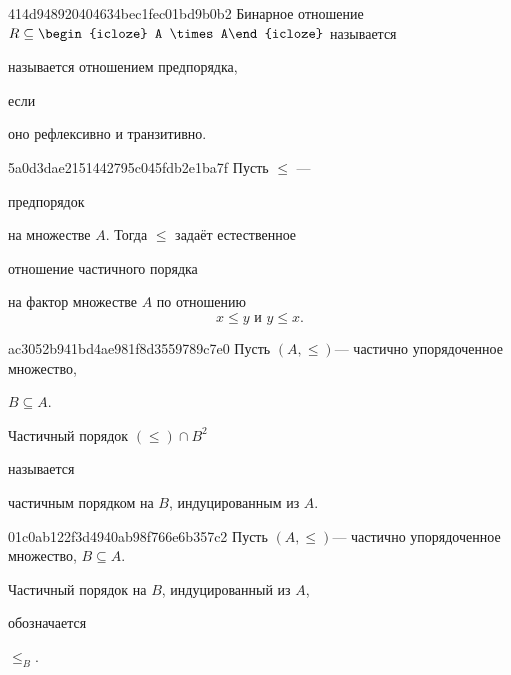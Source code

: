 \begin{note}{414d948920404634bec1fec01bd9b0b2}
    Бинарное отношение \({ R \subseteq \begin{icloze}{3}A \times A\end{icloze} }\) называется \begin{icloze}{2}называется отношением предпорядка,\end{icloze} если \begin{icloze}{1}оно рефлексивно и транзитивно.\end{icloze}
\end{note}

\begin{note}{5a0d3dae2151442795c045fdb2e1ba7f}
    Пусть \({ \leqslant }\) --- \begin{icloze}{3}предпорядок\end{icloze} на множестве \({ A }\).
    Тогда \({ \leqslant }\) задаёт естественное \begin{icloze}{2}отношение частичного порядка\end{icloze}
    \begin{icloze}{1}
        на фактор множестве \({ A }\) по отношению
        \[
            x \leqslant y \text{ и } y \leqslant x.
        \]
    \end{icloze}
\end{note}

\begin{note}{ac3052b941bd4ae981f8d3559789c7e0}
    Пусть \({ (A, \leqslant) }\)--- частично упорядоченное множество, \begin{icloze}{3}\({ B \subseteq A }\).\end{icloze}
    \begin{icloze}{2}Частичный порядок \({ (\leqslant) \cap B^2 }\)\end{icloze} называется \begin{icloze}{1}частичным порядком на \({ B }\), индуцированным из \({ A }\).\end{icloze}
\end{note}

\begin{note}{01c0ab122f3d4940ab98f766e6b357c2}
    Пусть \({ (A, \leqslant) }\)--- частично упорядоченное множество, \({ B \subseteq A }\).
    \begin{icloze}{2}Частичный порядок на \({ B }\), индуцированный из \({ A }\),\end{icloze} обозначается \begin{icloze}{1}\({ \leqslant_{B} }\).\end{icloze}
\end{note}

